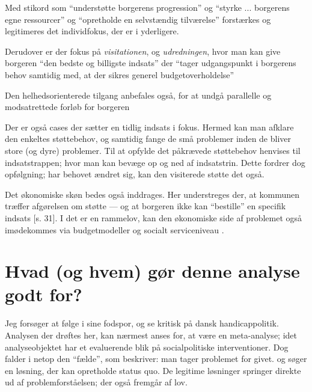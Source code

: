 Med stikord som “understøtte borgerens progression” og “styrke ... borgerens egne ressourcer” og “opretholde en selvstændig tilværelse” \autocite[s. 19]{klStyringAfDet2017} forstærkes og legitimeres det individfokus, der er i  yderligere.

Derudover er der fokus på \textit{visitationen}, og \textit{udredningen}, hvor man kan give borgeren “den bedste og billigste indsats” der “tager udgangspunkt i borgerens behov samtidig med, at der sikres generel budgetoverholdelse” \autocite[ss. 18, 28-30]{klStyringAfDet2017}

Den helhedsorienterede tilgang anbefales også, for at undgå parallelle og modsatrettede forløb for borgeren \autocite[ss. 34-35]{klStyringAfDet2017}

Der er også cases der sætter en tidlig indsats i fokus.
Hermed kan man afklare den enkeltes støttebehov, og samtidig fange de små problemer inden de bliver store (og dyre) problemer\autocite[ss 20-21]{klStyringAfDet2017}.
Til at opfylde det påkrævede støttebehov henvises til indsatstrappen; hvor man kan bevæge op og ned af indsatstrin.
Dette fordrer dog opfølgning; har behovet ændret sig, kan den visiterede støtte det også.

Det økonomiske skøn bedes også inddrages. Her understreges der, at kommunen træffer afgørelsen om støtte — og at borgeren ikke kan “bestille” en specifik indsats [s. 31].
I det  er en rammelov, kan den økonomiske side af problemet også imødekommes via budgetmodeller og socialt serviceniveau \autocite[ss. 36-37]{klStyringAfDet2017}.

\section{Hvad (og hvem) gør denne analyse godt for?}
Jeg forsøger at følge i  sine fodspor, og se kritisk på dansk handicappolitik.
Analysen der drøftes her, kan nærmest anses for, at være en meta-analyse; idet analyseobjektet har et evaluerende blik på socialpolitiske interventioner.
Dog falder  i netop den “fælde”, som \citeauthor{scheurichPolicyArchaeologyNew1994} beskriver: man tager problemet for givet. og søger en løsning, der kan opretholde status quo.
De legitime løsninger springer direkte ud af problemforståelsen; der også fremgår af lov.
